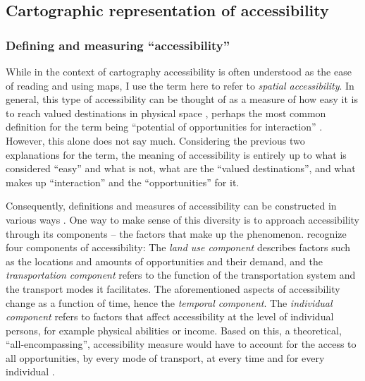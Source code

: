 




\subsection{Cartographic representation of accessibility}

\subsubsection{Defining and measuring \enquote{accessibility}}

While in the context of cartography accessibility is often understood as
the ease of reading and using maps,
I use the term here to refer to \textit{spatial accessibility}.
In general, this type of accessibility can be thought of as a measure of
how easy it is to reach valued destinations in physical space \parencite{lev2020},
perhaps the most common definition for the term being
\enquote{potential of opportunities for interaction} \parencite{han1959}.
However, this alone does not say much.
Considering the previous two explanations for the term,
the meaning of accessibility is entirely up to
what is considered \enquote{easy} and what is not,
what are the \enquote{valued destinations},
and what makes up \enquote{interaction} and the \enquote{opportunities} for it.

Consequently,
definitions and measures of accessibility can be constructed in various ways
\parencite{pap2016}.
One way to make sense of this diversity is to approach accessibility
through its components -- the factors that make up the phenomenon.
\textcite{geu2004} recognize four components of accessibility:
The \textit{land use component} describes factors
such as the locations and amounts of opportunities
and their demand,
and the \textit{transportation component} refers to
the function of the transportation system and the transport modes it facilitates.
The aforementioned aspects of accessibility change as a function of time,
hence the \textit{temporal component}.
The \textit{individual component} refers to
factors that affect accessibility at the level of individual persons,
for example physical abilities or income.
Based on this, a theoretical, \enquote{all-encompassing},
accessibility measure would have to account for
the access to all opportunities,
by every mode of transport,
at every time and for every individual \parencite{lev2020}.

